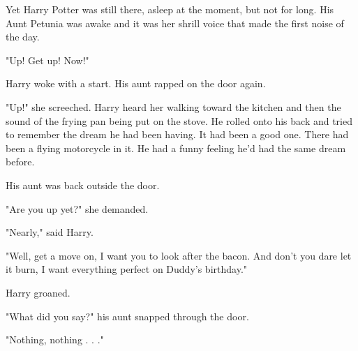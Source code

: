 Yet Harry Potter was still there, asleep at the moment, but not for long. His Aunt Petunia was awake and it was her shrill voice that made the first noise of the day. 

"Up! Get up! Now!" 

Harry woke with a start. His aunt rapped on the door again. 

"Up!" she screeched. Harry heard her walking toward the kitchen and then the sound of the frying pan being put on the stove. He rolled onto his back and tried to remember the dream he had been having. It had been a good one. There had been a flying motorcycle in it. He had a funny feeling he'd had the same dream before. 

His aunt was back outside the door. 

"Are you up yet?" she demanded. 

"Nearly," said Harry. 

"Well, get a move on, I want you to look after the bacon. And don't you dare let it burn, I want everything perfect on Duddy's birthday." 

Harry groaned. 

"What did you say?" his aunt snapped through the door. 

"Nothing, nothing . . ." 